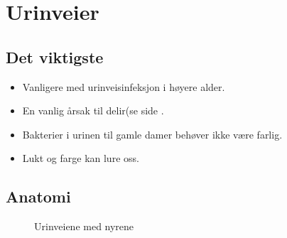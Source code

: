 \chapter{Urinveier}%
		\section{Det viktigste}
			\begin{itemize}
				\item Vanligere med urinveisinfeksjon i høyere alder.\\
				\item En vanlig årsak til delir(se side \pageref{delir}.\\
				\item Bakterier i urinen til gamle damer behøver ikke være farlig.\\
				\item Lukt og farge kan lure oss.\\
			\end{itemize}
		\section{Anatomi}
					\begin{figure}[ht]
                      \centering
                      \caption{Urinveiene med nyrene}
                    \end{figure}
